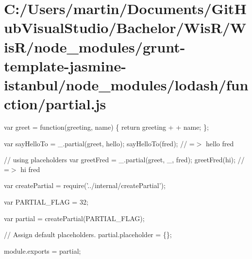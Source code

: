 \hypertarget{_c_1_2_users_2martin_2_documents_2_git_hub_visual_studio_2_bachelor_2_wis_r_2_wis_r_2node_module4d3a2a77f2786a69d0c146e259bc0336}{}\section{C\+:/\+Users/martin/\+Documents/\+Git\+Hub\+Visual\+Studio/\+Bachelor/\+Wis\+R/\+Wis\+R/node\+\_\+modules/grunt-\/template-\/jasmine-\/istanbul/node\+\_\+modules/lodash/function/partial.\+js}
var greet = function(greeting, name) \{ return greeting + \textquotesingle{} \textquotesingle{} + name; \};

var say\+Hello\+To = \+\_\+.\+partial(greet, \textquotesingle{}hello\textquotesingle{}); say\+Hello\+To(\textquotesingle{}fred\textquotesingle{}); // =$>$ \textquotesingle{}hello fred\textquotesingle{}

// using placeholders var greet\+Fred = \+\_\+.\+partial(greet, \+\_\+, \textquotesingle{}fred\textquotesingle{}); greet\+Fred(\textquotesingle{}hi\textquotesingle{}); // =$>$ \textquotesingle{}hi fred\textquotesingle{}


\begin{DoxyCodeInclude}
var createPartial = require(\textcolor{stringliteral}{'../internal/createPartial'});

var PARTIAL\_FLAG = 32;

var partial = createPartial(PARTIAL\_FLAG);

\textcolor{comment}{// Assign default placeholders.}
partial.placeholder = \{\};

module.exports = partial;
\end{DoxyCodeInclude}
 